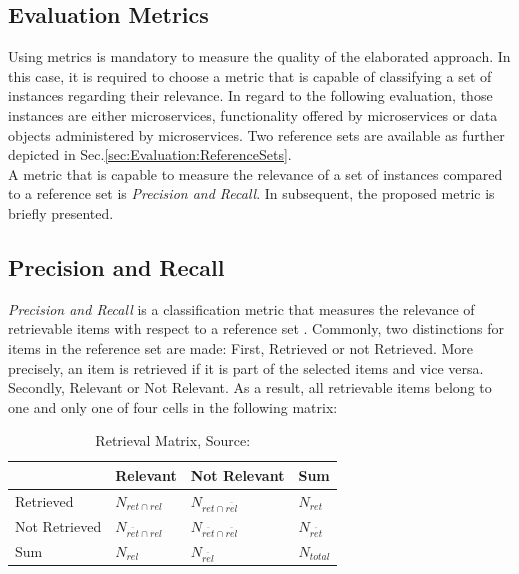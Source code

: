 \subsection{Evaluation Metrics}
\label{sec:Evaluation:Metrics}

Using metrics is mandatory to measure the quality of the elaborated approach. In this case, it is required to choose a metric that is capable of classifying a set of instances regarding their relevance.
In regard to the following evaluation, those instances are either microservices, functionality offered by microservices or data objects administered by microservices. Two reference sets are available as further depicted in Sec.\ref{sec:Evaluation:ReferenceSets}. \\
A metric that is capable to measure the relevance of a set of instances compared to a reference set is \textit{Precision and Recall}. In subsequent, the proposed metric is briefly presented.

\subsection{Precision and Recall}
\label{sec:Evaluation:Metrics:sPrecRecall}
\textit{Precision and Recall} is a classification metric that measures the relevance of retrievable items with respect to a reference set \cite{PrecisionRecall}. Commonly, two distinctions for items in the reference set are made: First, Retrieved or not Retrieved. More precisely, an item is retrieved if it is part of the selected items and vice versa. Secondly, Relevant or Not Relevant. As a result, all retrievable items belong to one and only one of four cells in the following matrix:


\begin{table}[!h]
	\centering
	\begin{tabular}{|l||l|l|l|}
		\hline
		& Relevant & Not Relevant & Sum \\ \hline
		Retrieved     &     $N_{ret\cap rel}$     &     $N_{ret\cap \overline{rel}}$            &     $N_{ret}$  \\ \hline
		Not Retrieved &      $N_{\overline{ret}\cap rel}$      &      $N_{\overline{ret}\cap \overline{rel}}$          &    $N_{\overline{ret}}$   \\\hline
		Sum           &         $N_{rel}$   &      $N_{\overline{rel}}$          &    $N_{total}$   \\ \hline
		
	\end{tabular}
\caption{Retrieval Matrix, Source: \cite{PrecisionRecall}}
    \label{tab:PrecRecall}
    
\end{table}

